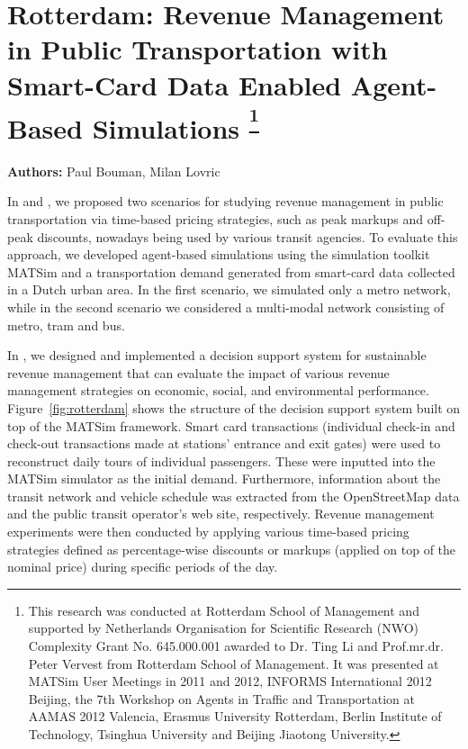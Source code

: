 \section{Rotterdam: Revenue Management in Public Transportation with Smart-Card Data Enabled Agent-Based Simulations \textsuperscript{\footnotesize{\footnote{This research was conducted at Rotterdam School of Management and
supported by Netherlands Organisation for Scientific Research (NWO)
Complexity Grant No. 645.000.001 awarded to Dr. Ting Li and Prof.mr.dr. Peter Vervest from
Rotterdam School of Management. It was presented at MATSim User Meetings in 2011 and 2012,
INFORMS International 2012 Beijing, the 7th Workshop on Agents in Traffic and Transportation at
AAMAS 2012 Valencia, Erasmus University Rotterdam, Berlin Institute of Technology, Tsinghua
University and Beijing Jiaotong University.}}}}
\label{sec:rotterdam}
\hfill \textbf{Authors:} Paul Bouman, Milan Lovric

In \citet[][]{LovricEtAl_DSS_2013} and \citet[][]{BoumanEtAl_AAMAS_2012}, we proposed two scenarios for studying revenue management in public transportation via time-based pricing strategies, such as peak markups and off-peak discounts, nowadays being used by various transit agencies. To evaluate this approach, we developed agent-based simulations using the simulation toolkit MATSim and a transportation demand generated from smart-card data collected in a Dutch urban area. In the first scenario, we simulated only a metro network, while in the second scenario we considered a multi-modal network consisting of metro, tram and bus.

In \citet[][]{LovricEtAl_DSS_2013}, we designed and implemented a decision support system for sustainable revenue management that can evaluate the impact of various revenue management strategies on economic, social, and environmental performance. Figure~\ref{fig:rotterdam} shows the structure of the decision support system built on top of the MATSim framework. Smart card transactions (individual check-in and check-out transactions made at stations' entrance and exit gates) were used to reconstruct daily tours of individual passengers. These were inputted into the MATSim simulator as the initial demand. Furthermore, information about the transit network and vehicle schedule was extracted from the OpenStreetMap data and the public transit operator's web site, respectively. Revenue management experiments were then conducted by applying various time-based pricing strategies defined as percentage-wise discounts or markups (applied on top of the nominal price) during specific periods of the day. 

